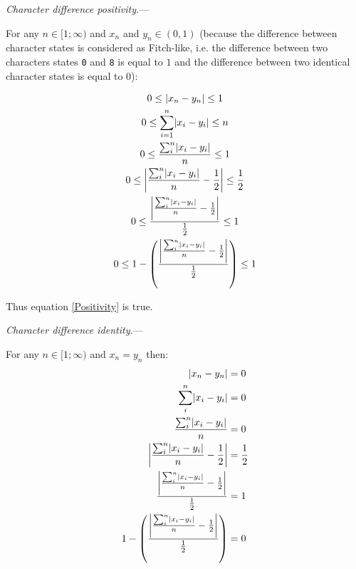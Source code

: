 \documentclass[12pt,letterpaper]{article}
\DeclarePairedDelimiter\abs{\lvert}{\rvert}%
\renewcommand{\subsection}[1]{%
\bigskip
\begin{center}
\begin{large}
\normalfont\itshape #1
\end{large}
\end{center}}
\renewcommand{\subsection}[1]{%
\vspace{2ex}
\noindent
\textit{#1.}---}
\begin{document}
\subsection{Character difference positivity}

For any $n \in [1;\infty)$ and $x_{n}$ and $y_{n} \in (0,1)$ (because the difference between character states is considered as Fitch-like, i.e. the difference between two characters states \texttt{0} and \texttt{8} is equal to $1$ and the difference between two identical character states is equal to $0$):

\begin{equation}
    \label{positive_demo}
    \begin{gathered}
    0 \leq  \abs{x_{n}-y_{n}} \leq 1\\
    0 \leq  \sum_{i=1}^{n}\abs{x_{i}-y_{i}} \leq n\\
    0 \leq  \frac{\sum_{i}^{n}\abs{x_{i}-y_{i}}}{n} \leq 1\\
    0 \leq  \abs*{\frac{\sum_{i}^{n}\abs{x_{i}-y_{i}}}{n}-\frac{1}{2}} \leq \frac{1}{2}\\
    0 \leq  \frac{\abs*{\frac{\sum_{i}^{n}\abs{x_{i}-y_{i}}}{n}-\frac{1}{2}}}{\frac{1}{2}} \leq 1\\
    0 \leq  1 - \left(\frac{\abs*{\frac{\sum_{i}^{n}\abs{x_{i}-y_{i}}}{n}-\frac{1}{2}}}{\frac{1}{2}}\right) \leq 1\\
    \end{gathered}
\end{equation}

Thus equation \ref{Positivity} is true.

\subsection{Character difference identity}

For any $n \in [1;\infty)$ and $x_{n} = y_{n}$ then:
\begin{equation}
    \label{identitydemo}
    \begin{aligned}
    \abs{x_{n}-y_{n}} &= 0\\
    \sum_{i}^{n}\abs{x_{i}-y_{i}} &= 0\\
    \frac{\sum_{i}^{n}\abs{x_{i}-y_{i}}}{n} &= 0\\
    \abs*{\frac{\sum_{i}^{n}\abs{x_{i}-y_{i}}}{n}-\frac{1}{2}} &= \frac{1}{2}\\
    \frac{\abs*{\frac{\sum_{i}^{n}\abs{x_{i}-y_{i}}}{n}-\frac{1}{2}}}{\frac{1}{2}} &= 1\\
    1 - \left(\frac{\abs*{\frac{\sum_{i}^{n}\abs{x_{i}-y_{i}}}{n}-\frac{1}{2}}}{\frac{1}{2}}\right) &= 0\\
    \end{aligned}
\end{equation}
\end{document}
